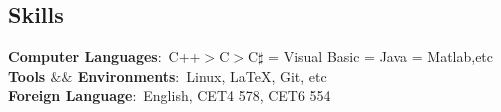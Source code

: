 \documentclass[margin]{res}
\begin{document}
\begin{resume}
\section{Skills}
\textbf{Computer Languages}:~C++$>$C$>$C$\sharp$ = Visual Basic = Java = Matlab,etc\\
\textbf{Tools $\&\&$ Environments}:~Linux, \LaTeX, Git, etc\\
\textbf{Foreign Language}:~English, CET4 578, CET6 554\\







\end{resume}
\end{document}
